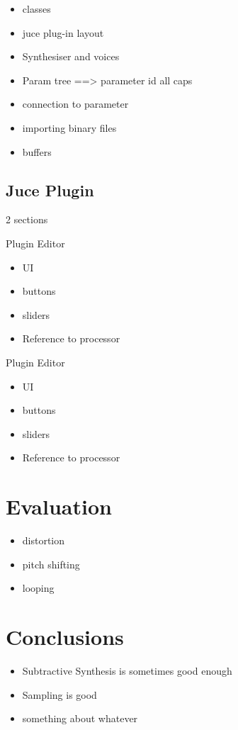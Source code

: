 \documentclass[12pt]{article}
\begin{document}
	\begin{itemize}
		\item classes
		\item juce plug-in layout
		\item Synthesiser and voices
		\item Param tree ==> parameter id all caps
		\item connection to parameter
		\item importing binary files
		\item buffers
	\end{itemize}

	\subsection{Juce Plugin}
	2 sections
	
	Plugin Editor
	\begin{itemize}
		\item UI
		\item buttons
		\item sliders
		\item Reference to processor
	\end{itemize}
	
	
	Plugin Editor
	\begin{itemize}
		\item UI
		\item buttons
		\item sliders
		\item Reference to processor
	\end{itemize}
	
	
	

	
\section{Evaluation}

\begin{itemize}
	\item distortion
	\item pitch shifting
	\item looping
\end{itemize}
	
\section{Conclusions}
\begin{itemize}
	\item 	Subtractive Synthesis is sometimes good enough
	\item Sampling is good
	\item something about whatever
\end{itemize}
\end{document}
